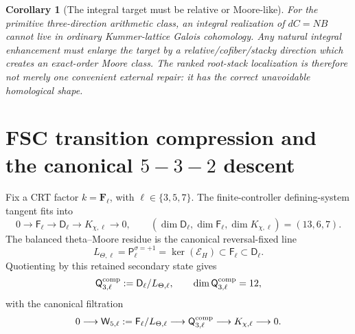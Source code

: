 \documentclass[11pt]{article}
\newtheorem{corollary}[theorem]{Corollary}
\theoremstyle{remark}
\newcommand{\F}{\mathbf F}
\begin{document}
\begin{corollary}[The integral target must be relative or Moore-like]\label{P1L-cor:moore-target-necessary}
For the primitive three-direction arithmetic class, an integral realization of $dC=NB$ cannot live in ordinary Kummer-lattice Galois cohomology.  Any natural integral enhancement must enlarge the target by a relative/cofiber/stacky direction which creates an exact-order Moore class.  The ranked root-stack localization is therefore not merely one convenient external repair: it has the correct unavoidable homological shape.
\end{corollary}



\section{FSC transition compression and the canonical
\texorpdfstring{\(5\!-\!3\!-\!2\)}{5-3-2} descent}
\label{P1L-sec:ordered-fsc-compression}

Fix a CRT factor \(k=\F_\ell\), with \(\ell\in\{3,5,7\}\).  The
finite-controller defining-system tangent fits into
\begin{equation}\label{P1L-eq:v31-D-F-K}
 0\longrightarrow \mathsf F_\ell
 \longrightarrow \mathsf D_\ell
 \longrightarrow K_{\chi,\ell}
 \longrightarrow0,
 \qquad
 (\dim\mathsf D_\ell,\dim\mathsf F_\ell,\dim K_{\chi,\ell})=(13,6,7).
\end{equation}
The balanced theta--Moore residue is the canonical reversal-fixed line
\begin{equation}\label{P1L-eq:v31-Ltheta}
 L_{\Theta,\ell}
 =\mathsf P_\ell^{\sigma=+1}
 =\ker(\mathcal E_H)
 \subset\mathsf F_\ell\subset\mathsf D_\ell.
\end{equation}
Quotienting by this retained secondary state gives
\begin{equation}\label{P1L-eq:v31-Qcomp}
 \mathsf Q^{\rm comp}_{3,\ell}
 :=\mathsf D_\ell/L_{\Theta,\ell},
 \qquad
 \dim\mathsf Q^{\rm comp}_{3,\ell}=12,
\end{equation}
with the canonical filtration
\begin{equation}\label{P1L-eq:v31-Q-filtration}
 0\longrightarrow
 \mathsf W_{5,\ell}:=\mathsf F_\ell/L_{\Theta,\ell}
 \longrightarrow\mathsf Q^{\rm comp}_{3,\ell}
 \longrightarrow K_{\chi,\ell}
 \longrightarrow0.
\end{equation}
\end{document}
